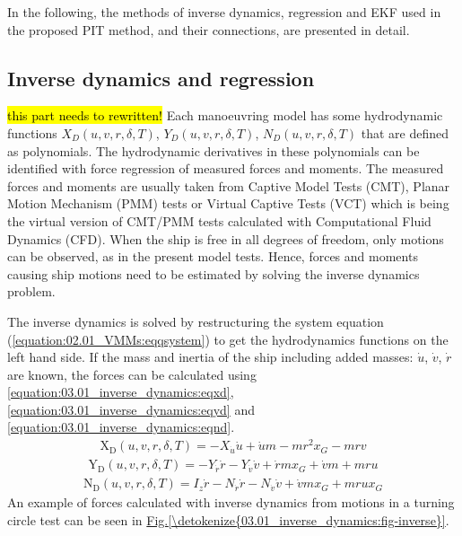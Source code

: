 \documentclass[review]{elsarticle}
\begin{document}
\sphinxAtStartPar
In the following, the methods of inverse dynamics, regression and EKF used in the proposed PIT method, and their connections, are presented in detail.


\subsection{Inverse dynamics and regression}\hl{this part needs to rewritten!}
\label{\detokenize{03.01_inverse_dynamics:inverse-dynamics-and-regression}}\label{\detokenize{03.01_inverse_dynamics::doc}}
\sphinxAtStartPar
Each manoeuvring model has some hydrodynamic functions \(X_D(u,v,r,\delta,T)\), \(Y_D(u,v,r,\delta,T)\), \(N_D(u,v,r,\delta,T)\) that are defined as polynomials. The hydrodynamic derivatives in these polynomials can be identified with force regression of measured forces and moments. The measured forces and moments are usually taken from Captive Model Tests (CMT), Planar Motion Mechanism (PMM) tests or Virtual Captive Tests (VCT) which is being the virtual version of CMT/PMM tests calculated with Computational Fluid Dynamics (CFD). When the ship is free in all degrees of freedom, only motions can be observed, as in the present model tests. Hence, forces and moments causing ship motions need to be estimated by solving the inverse dynamics problem.

\sphinxAtStartPar
The inverse dynamics is solved by restructuring the system equation (\autoref{equation:02.01_VMMs:eqqsystem}) to get the hydrodynamics functions on the left hand side. If the mass and inertia of the ship including added masses: \(\dot{u}\), \(\dot{v}\), \(\dot{r}\) are known, the forces can be calculated using \autoref{equation:03.01_inverse_dynamics:eqxd}, \autoref{equation:03.01_inverse_dynamics:eqyd} and \autoref{equation:03.01_inverse_dynamics:eqnd}.
\begin{equation}\label{equation:03.01_inverse_dynamics:eqxd}
\begin{split}\displaystyle \operatorname{X_{D}}{\left(u,v,r,\delta,T \right)} = - X_{\dot{u}} \dot{u} + \dot{u} m - m r^{2} x_{G} - m r v\end{split}
\end{equation}\begin{equation}\label{equation:03.01_inverse_dynamics:eqyd}
\begin{split}\displaystyle \operatorname{Y_{D}}{\left(u,v,r,\delta,T \right)} = - Y_{\dot{r}} \dot{r} - Y_{\dot{v}} \dot{v} + \dot{r} m x_{G} + \dot{v} m + m r u\end{split}
\end{equation}\begin{equation}\label{equation:03.01_inverse_dynamics:eqnd}
\begin{split}\displaystyle \operatorname{N_{D}}{\left(u,v,r,\delta,T \right)} = I_{z} \dot{r} - N_{\dot{r}} \dot{r} - N_{\dot{v}} \dot{v} + \dot{v} m x_{G} + m r u x_{G}\end{split}
\end{equation}
\sphinxAtStartPar
An example of forces calculated with inverse dynamics from motions in a turning circle test can be seen in \hyperref[\detokenize{03.01_inverse_dynamics:fig-inverse}]{Fig.\@ \ref{\detokenize{03.01_inverse_dynamics:fig-inverse}}}.
\end{document}
